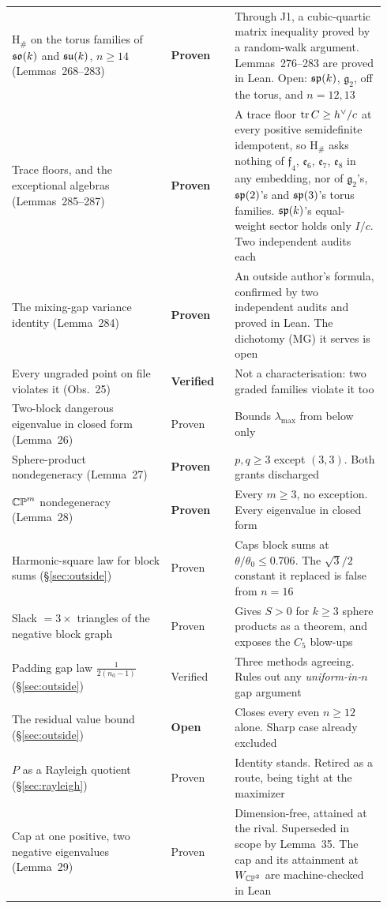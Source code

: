 \begin{longtable}{@{}p{0.40\linewidth}p{0.16\linewidth}p{0.38\linewidth}@{}}
H$_\#$ on the torus families of $\mathfrak{so}(k)$ and $\mathfrak{su}(k)$, $n\ge14$ (Lemmas~268--283) & \textbf{Proven} & Through J1, a cubic-quartic matrix inequality proved by a random-walk argument. Lemmas~276--283 are proved in Lean. Open: $\mathfrak{sp}(k)$, $\mathfrak g_2$, off the torus, and $n=12,13$ \\
Trace floors, and the exceptional algebras (Lemmas~285--287) & \textbf{Proven} & A trace floor $\operatorname{tr} C\ge h^\vee/c$ at every positive semidefinite idempotent, so H$_\#$ asks nothing of $\mathfrak f_4$, $\mathfrak e_6$, $\mathfrak e_7$, $\mathfrak e_8$ in any embedding, nor of $\mathfrak g_2$'s, $\mathfrak{sp}(2)$'s and $\mathfrak{sp}(3)$'s torus families. $\mathfrak{sp}(k)$'s equal-weight sector holds only $I/c$. Two independent audits each \\
The mixing-gap variance identity (Lemma~284) & \textbf{Proven} & An outside author's formula, confirmed by two independent audits and proved in Lean. The dichotomy (MG) it serves is open \\
Every ungraded point on file violates it (Obs.~25) & \textbf{Verified} & Not a characterisation: two graded families violate it too \\
Two-block dangerous eigenvalue in closed form (Lemma~26) & Proven & Bounds $\lambda_{\max}$ from below only \\
Sphere-product nondegeneracy (Lemma~27) & \textbf{Proven} & $p,q\ge3$ except $(3,3)$. Both grants discharged \\
$\mathbb{CP}^m$ nondegeneracy (Lemma~28) & \textbf{Proven} & Every $m\ge3$, no exception. Every eigenvalue in closed form \\
Harmonic-square law for block sums (\S\ref{sec:outside}) & Proven & Caps block sums at $\theta/\theta_0\le0.706$. The $\sqrt3/2$ constant it replaced is false from $n=16$ \\
Slack $=3\times$ triangles of the negative block graph & Proven & Gives $S>0$ for $k\ge3$ sphere products as a theorem, and exposes the $C_5$ blow-ups \\
Padding gap law $\tfrac1{2(n_0-1)}$ (\S\ref{sec:outside}) & Verified & Three methods agreeing. Rules out any \emph{uniform-in-$n$} gap argument \\
The residual value bound (\S\ref{sec:outside}) & \textbf{Open} & Closes every even $n\ge12$ alone. Sharp case already excluded \\
$P$ as a Rayleigh quotient (\S\ref{sec:rayleigh}) & Proven & Identity stands. Retired as a route, being tight at the maximizer \\
Cap at one positive, two negative eigenvalues (Lemma~29) & Proven & Dimension-free, attained at the rival. Superseded in scope by Lemma~35. The cap and its attainment at $W_{\mathbb{CP}^2}$ are machine-checked in Lean \\

\end{longtable}
